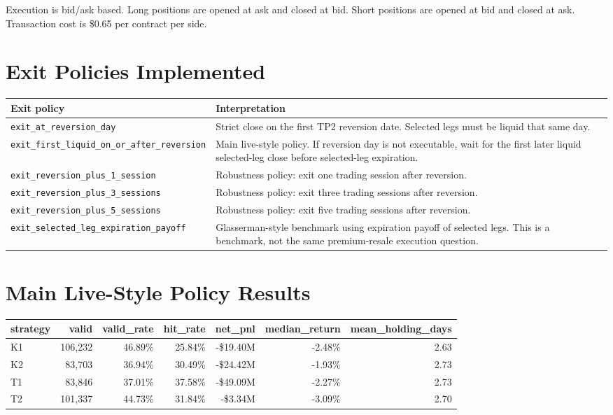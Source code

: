 \documentclass[11pt]{article}
\begin{document}
Execution is bid/ask based. Long positions are opened at ask and closed at bid. Short positions
are opened at bid and closed at ask. Transaction cost is \$0.65 per contract per side.

\section{Exit Policies Implemented}

\begin{center}
\begin{tabularx}{0.96\linewidth}{lX}
\toprule
Exit policy & Interpretation \\
\midrule
\texttt{exit\_at\_reversion\_day} & Strict close on the first TP2 reversion date. Selected legs must be liquid that same day. \\
\texttt{exit\_first\_liquid\_on\_or\_after\_reversion} & Main live-style policy. If reversion day is not executable, wait for the first later liquid selected-leg close before selected-leg expiration. \\
\texttt{exit\_reversion\_plus\_1\_session} & Robustness policy: exit one trading session after reversion. \\
\texttt{exit\_reversion\_plus\_3\_sessions} & Robustness policy: exit three trading sessions after reversion. \\
\texttt{exit\_reversion\_plus\_5\_sessions} & Robustness policy: exit five trading sessions after reversion. \\
\texttt{exit\_selected\_leg\_expiration\_payoff} & Glasserman-style benchmark using expiration payoff of selected legs. This is a benchmark, not the same premium-resale execution question. \\
\bottomrule
\end{tabularx}
\end{center}

\section{Main Live-Style Policy Results}

\begin{center}
\begin{tabular}{lrrrrrr}
\toprule
strategy & valid & valid\_rate & hit\_rate & net\_pnl & median\_return & mean\_holding\_days \\
\midrule
K1 & 106,232 & 46.89\% & 25.84\% & -\$19.40M & -2.48\% & 2.63 \\
K2 & 83,703 & 36.94\% & 30.49\% & -\$24.42M & -1.93\% & 2.73 \\
T1 & 83,846 & 37.01\% & 37.58\% & -\$49.09M & -2.27\% & 2.73 \\
T2 & 101,337 & 44.73\% & 31.84\% & -\$3.34M & -3.09\% & 2.70 \\
\bottomrule
\end{tabular}
\end{center}
\end{document}
